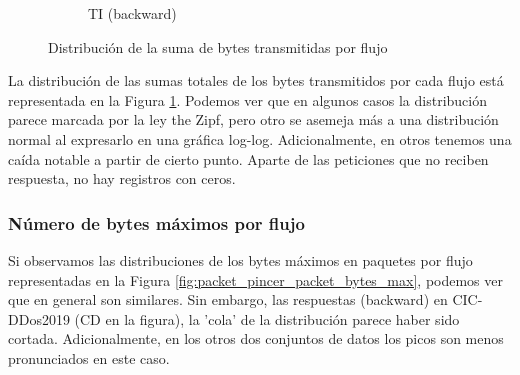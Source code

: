\begin{figure}[H]
\begin{subfigure}[b]{0.26\textwidth}
        \caption{TI (backward)}
    \end{subfigure}
    \hfill
       \caption{Distribución de la suma de bytes transmitidas por flujo}
       \label{fig:packet_pincer_packet_bytes_sum}
\end{figure}

La distribución de las sumas totales de los bytes transmitidos por cada flujo está representada en la Figura \ref{fig:packet_pincer_packet_bytes_sum}. Podemos ver que en algunos casos la distribución parece marcada por la ley the Zipf, pero otro se asemeja más a una distribución normal al expresarlo en una gráfica log-log. Adicionalmente, en otros tenemos una caída notable a partir de cierto punto. Aparte de las peticiones que no reciben respuesta, no hay registros con ceros.

\subsubsection{Número de bytes máximos por flujo}

Si observamos las distribuciones de los bytes máximos en paquetes por flujo representadas en la Figura \ref{fig:packet_pincer_packet_bytes_max}, podemos ver que en general son similares. Sin embargo, las respuestas (backward) en CIC-DDos2019 (CD en la figura), la 'cola' de la distribución parece haber sido cortada. Adicionalmente, en los otros dos conjuntos de datos los picos son menos pronunciados en este caso.

